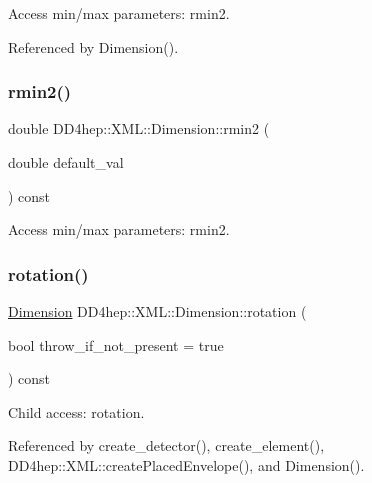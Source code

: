 Access min/max parameters\+: rmin2. 



Referenced by Dimension().

\hypertarget{struct_d_d4hep_1_1_x_m_l_1_1_dimension_a1c045bf27fd8799446fa080f30147e3f}{}\label{struct_d_d4hep_1_1_x_m_l_1_1_dimension_a1c045bf27fd8799446fa080f30147e3f} 
\subsubsection{\texorpdfstring{rmin2()}{rmin2()}\hspace{0.1cm}{\footnotesize\ttfamily [2/2]}}
{\footnotesize\ttfamily double D\+D4hep\+::\+X\+M\+L\+::\+Dimension\+::rmin2 (\begin{DoxyParamCaption}\item[{double}]{default\+\_\+val }\end{DoxyParamCaption}) const}



Access min/max parameters\+: rmin2. 

\hypertarget{struct_d_d4hep_1_1_x_m_l_1_1_dimension_a1dd6c902b4251be50f137efa1fc12ccf}{}\label{struct_d_d4hep_1_1_x_m_l_1_1_dimension_a1dd6c902b4251be50f137efa1fc12ccf} 
\subsubsection{\texorpdfstring{rotation()}{rotation()}}
{\footnotesize\ttfamily \hyperlink{struct_d_d4hep_1_1_x_m_l_1_1_dimension}{Dimension} D\+D4hep\+::\+X\+M\+L\+::\+Dimension\+::rotation (\begin{DoxyParamCaption}\item[{bool}]{throw\+\_\+if\+\_\+not\+\_\+present = {\ttfamily true} }\end{DoxyParamCaption}) const}



Child access\+: rotation. 



Referenced by create\+\_\+detector(), create\+\_\+element(), D\+D4hep\+::\+X\+M\+L\+::create\+Placed\+Envelope(), and Dimension().

